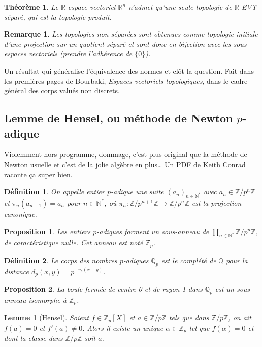 \documentclass[a4paper, 11pt]{article}
\def\Z{\mathbb{Z}}
\def\N{\mathbb{N}}
\def\Q{\mathbb{Q}}
\def\R{\mathbb{R}}
\newtheorem*{definition}{Définition}
\newtheorem*{proposition}{Proposition}
\newtheorem*{theorem}{Théorème}
\newtheorem*{lemma}{Lemme}
\newtheorem*{remark}{Remarque}
\begin{document}
\begin{theorem}
  Le $\R$-espace vectoriel $\R^n$ n'admet qu'une seule topologie de $\R$-EVT
  séparé, qui est la topologie produit.
\end{theorem}

\begin{remark}
  Les topologies non séparées sont obtenues comme topologie initiale d'une
  projection sur un quotient séparé et sont donc en bijection avec les
  sous-espaces vectoriels (prendre l'adhérence de $\{0\}$).
\end{remark}

Un résultat qui généralise l'équivalence des normes et clôt la question. Fait
dans les premières pages de Bourbaki, \emph{Espaces vectoriels topologiques},
dans le cadre général des corps valués non discrets.

\subsection{Lemme de Hensel, ou méthode de Newton $p$-adique}

Violemment hors-programme, dommage, c'est plus original que la méthode de Newton
usuelle et c'est de la jolie algèbre en plus… Un PDF de Keith Conrad raconte ça
super bien.

\begin{definition}
  On appelle \emph{entier $p$-adique} une suite $(a_n)_{n \in \N^*}$
  avec $a_n \in \Z/p^n\Z$ et $\pi_n(a_{n+1}) = a_n$ pour $n \in \N^*$,
  où $\pi_n : \Z/p^{n+1}\Z \to \Z/p^n\Z$ est la projection canonique.
\end{definition}
\begin{proposition}
  Les entiers $p$-adiques forment un sous-anneau de
  $\prod_{n \in \N^*} \Z/p^n\Z$, de caractéristique nulle. Cet anneau
  est noté $\Z_p$.
\end{proposition}

\begin{definition}
  Le \emph{corps des nombres $p$-adiques} $\Q_p$ est le complété de
  $\Q$ pour la distance $d_p(x,y) = p^{-v_p(x-y)}$.
\end{definition}
\begin{proposition}
  La boule fermée de centre 0 et de rayon 1 dans $\Q_p$ est un
  sous-anneau isomorphe à $\Z_p$.
\end{proposition}

\begin{lemma}[Hensel]
  Soient $f \in \Z_p[X]$ et $a \in \Z/p\Z$ tels que dans $\Z/p\Z$, on
  ait $f(a) = 0$ et $f'(a) \neq 0$. Alors il existe un unique
  $\alpha \in \Z_p$ tel que $f(\alpha) = 0$ et dont la classe dans
  $\Z/p\Z$ soit $a$.
\end{lemma}
\end{document}
